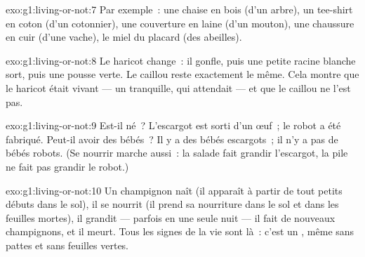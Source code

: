 \begin{solution}{exo:g1:living-or-not:7}
Par exemple~: une chaise en bois (d'un arbre), un tee-shirt en coton
(d'un cotonnier), une couverture en laine (d'un mouton), une
chaussure en cuir (d'une vache), le miel du placard (des abeilles).
\end{solution}

\begin{solution}{exo:g1:living-or-not:8}
Le haricot change~: il gonfle, puis une petite racine blanche sort,
puis une pousse verte. Le caillou reste exactement le même. Cela
montre que le haricot était vivant --- un  tranquille,
qui attendait --- et que le caillou ne l'est pas.
\end{solution}

\begin{solution}{exo:g1:living-or-not:9}
Est-il né~? L'escargot est sorti d'un œuf~; le robot a été
fabriqué. Peut-il avoir des bébés~? Il y a des bébés escargots~; il
n'y a pas de bébés robots. (Se nourrir marche aussi~: la salade fait
grandir l'escargot, la pile ne fait pas grandir le robot.)
\end{solution}

\begin{solution}{exo:g1:living-or-not:10}
Un champignon naît (il apparaît à partir de tout petits débuts dans
le sol), il se nourrit (il prend sa nourriture dans le sol et dans
les feuilles mortes), il grandit --- parfois en une seule nuit ---
il fait de nouveaux champignons, et il meurt. Tous les signes de la
vie sont là~: c'est un , même sans pattes et sans
feuilles vertes.
\end{solution}
